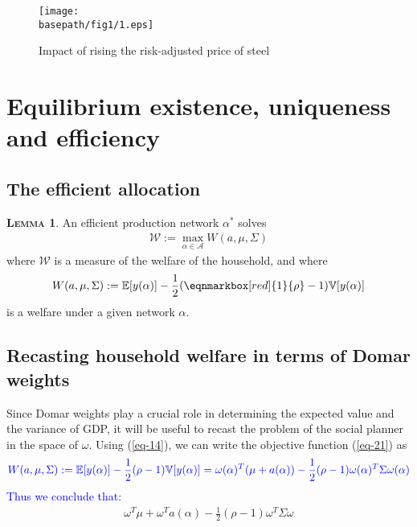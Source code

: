 \documentclass[11pt]{article}
\theoremstyle{definition}
\newtheorem{lemma}{\noindent \textbf{\textsc{Lemma}}}
\newcommand{\basepath}{F:/12004835/replication_package_final/replication_package_final/output_figures}
\begin{document}
	\begin{figure}[ht]
		\caption{Impact of rising the risk-adjusted price of steel}
		\texttt{[image: \\basepath/fig1/1.eps]}
		\label{fig:1}
	\end{figure}
	
	\section{Equilibrium existence, uniqueness and efficiency}
	
	\subsection{The efficient allocation}
	\begin{lemma}
		An efficient production network $\alpha^*$ solves
		\begin{align*}
			\mathcal{W} := \max\limits_{\alpha\in\mathcal{A}} W(a,\mu,\Sigma)
		\end{align*}
		where $\mathcal{W}$ is a measure of the welfare of the household, and where
		\begin{align}
			W(a,\mu,\Sigma) := \mathbb{E}[y(\alpha)] - \frac{1}{2}(\eqnmarkbox[red]{1}{\rho} - 1) \mathbb{V}[y(\alpha)]\label{eq-21}
		\end{align}
		\noindent is a welfare under a given network $\alpha$.
	\end{lemma}
	
	\subsection*{Recasting household welfare in terms of Domar weights}
	Since Domar weights play a crucial role in determining the expected value and the variance of GDP, it will be useful to recast the problem of the social planner in the space of $\omega$. Using (\ref{eq-14}), we can write the objective function (\ref{eq-21}) as
	\begin{align*}
		\color{blue} W(a,\mu,\Sigma) := \mathbb{E}[y(\alpha)] - \frac{1}{2}(\rho - 1) \mathbb{V}[y(\alpha)] = \omega(\alpha)^T(\mu + a(\alpha)) - \frac{1}{2}(\rho-1) \omega(\alpha)^T\Sigma\omega(\alpha) 
	\end{align*}
	\textcolor{blue}{Thus we conclude that:}
	\begin{align}
		\omega^T\mu + \omega^Ta(\alpha) - \frac{1}{2}(\rho-1)\omega^T\Sigma\omega \label{eq-22}
	\end{align}
	
\end{document}
